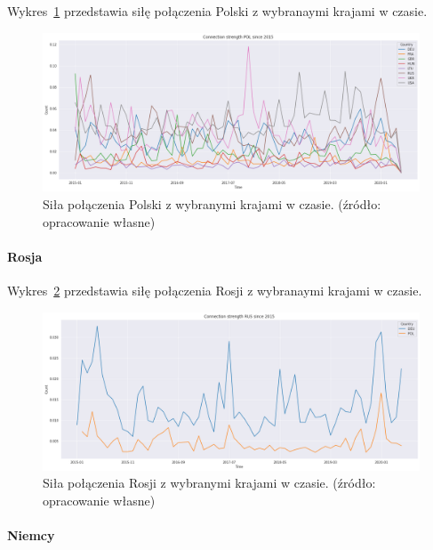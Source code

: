 \documentclass[11pt]{report}
\begin{document}
    Wykres~\ref{fig:PLConnection} przedstawia siłę połączenia Polski z wybranaymi krajami w czasie.


    \begin{figure}[ht!]
        \centering
        \includegraphics[width=1 \textwidth]{fig/PL/POLConnection.png}
        \caption{Siła połączenia Polski z wybranymi krajami w czasie. (źródło: opracowanie własne)}
        \label{fig:PLConnection}
    \end{figure}

    \paragraph{Rosja}

    Wykres~\ref{fig:RUSConnection} przedstawia siłę połączenia Rosji z wybranaymi krajami w czasie.

    \begin{figure}[ht!]
        \centering
        \includegraphics[width=1 \textwidth]{fig/RUS/RUSConnection.png}
        \caption{Siła połączenia Rosji z wybranymi krajami w czasie. (źródło: opracowanie własne)}
        \label{fig:RUSConnection}
    \end{figure}

    \paragraph{Niemcy}
\end{document}
